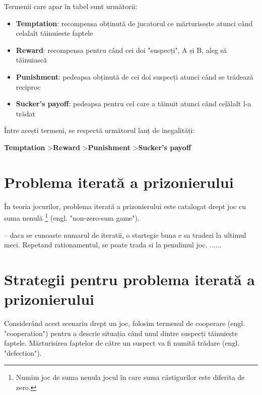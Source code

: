 Termenii care apar în tabel sunt următorii: 
 
\begin{itemize} 
	\item \textbf{Temptation}: recompensa obținută de jucatorul ce mărturisește atunci când celalalt tăinuieste faptele 
	\item \textbf{Reward}: recompensa pentru când cei doi "suspecți", A și B, aleg să tăinuiască 
	\item \textbf{Punishment}: pedeapsa obținută de cei doi suspecți atunci când se trădează reciproc 
	\item \textbf{Sucker's payoff}: pedeapsa pentru cel care a tăinuit atunci când celălalt l-a trădat 
\end{itemize} 
 
Între acești termeni, se respectă următorul lanț de inegalități: 
 
\begin{center} 
	\textbf{Temptation} \textgreater \textbf{Reward} \textgreater \textbf{Punishment} \textgreater \textbf{Sucker's payoff} 
\end{center} 
 
\section {Problema iterată a prizonierului} 

În teoria jocurilor, problema iterată a prizonierului este catalogat drept joc cu suma nenulă \footnote{Numim joc de suma nenula jocul în care suma câstigurilor este diferita de zero.} (engl. "non-zero-sum game").

-- daca se cunoaste numarul de iteratii, o startegie buna e sa tradezi la ultimul meci. Repetand rationamentul, se poate trada si la penulimul joc. ......

\section {Strategii pentru problema iterată a prizonierului}

Considerând acest scenariu drept un joc, folosim termenul de cooperare (engl. "cooperation") pentru a descrie situația când unul dintre suspecți tăinuiește faptele. Mărturisirea faptelor de către un suspect va fi numită trădare (engl. "defection"). 

